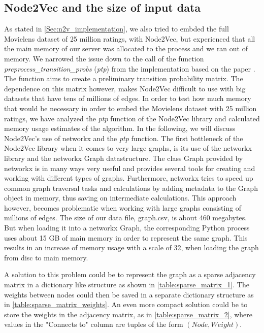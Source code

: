 \subsection{Node2Vec and the size of input data}\label{AP:N2V}

As stated in \autoref{Sec:n2v_implementation}, we also tried to embded the full Movielens dataset of 25 million ratings, with Node2Vec, but experienced that all the main memory of our server was allocated to the process and we ran out of memory. We narrowed the issue down to the call of the function  \textit{preprocess\_transition\_probs} (\textit{ptp}) from the implementation based on the paper \cite{Node2vec}.
The function aims to create a preliminary transition probability matrix. The dependence on this matrix however, makes Node2Vec difficult to use with big datasets that have tens of millions of edges.
In order to test how much memory that would be necessary in order to embed the Movielens dataset with 25 million ratings, we have analyzed the \textit{ptp} function of the Node2Vec library and calculated memory usage estimates of the algorithm.
In the following, we will discuss Node2Vec's use of networkx and the \textit{ptp} function.
The first bottleneck of the Node2Vec library when it comes to very large graphs, is its use of the networkx library and the networkx Graph datastructure.
The class Graph provided by networkx is in many ways very useful and provides several tools for creating and working with different types of graphs. Furthermore, networkx tries to speed up common graph traversal tasks and calculations by adding metadata to the Graph object in memory, thus saving on intermediate calculations.
This approach however, becomes problematic when working with large graphs consisting of millions of edges.
The size of our data file, graph.csv, is about 460 megabytes. But when loading it into a networkx Graph, the corresponding Python process uses about 15 GB of main memory in order to represent the same graph.
This results in an increase of memory usage with a scale of 32, when loading the graph from disc to main memory.

A solution to this problem could be to represent the graph as a sparse adjacency matrix in a dictionary like structure as shown in \autoref{table:sparse_matrix_1}.
The weights between nodes could then be saved in a separate dictionary structure as in \autoref{table:sparse_matrix_weights}.
An even more compact solution could be to store the weights in the adjacency matrix, as in \autoref{table:sparse_matrix_2}, where values in the "Connects to" column are tuples of the form $(Node, Weight)$.

